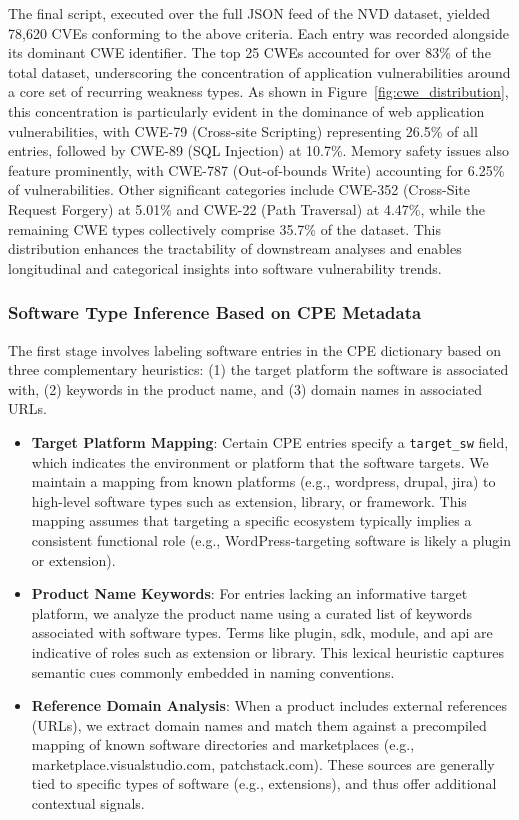 The final script, executed over the full JSON feed of the NVD dataset, yielded 78,620 CVEs conforming to the above criteria. Each entry was recorded alongside its dominant CWE identifier. The top 25 CWEs accounted for over 83\% of the total dataset, underscoring the concentration of application vulnerabilities around a core set of recurring weakness types. As shown in Figure~\ref{fig:cwe_distribution}, this concentration is particularly evident in the dominance of web application vulnerabilities, with CWE-79 (Cross-site Scripting) representing 26.5\% of all entries, followed by CWE-89 (SQL Injection) at 10.7\%. Memory safety issues also feature prominently, with CWE-787 (Out-of-bounds Write) accounting for 6.25\% of vulnerabilities. Other significant categories include CWE-352 (Cross-Site Request Forgery) at 5.01\% and CWE-22 (Path Traversal) at 4.47\%, while the remaining CWE types collectively comprise 35.7\% of the dataset. This distribution enhances the tractability of downstream analyses and enables longitudinal and categorical insights into software vulnerability trends.

\subsubsection{Software Type Inference Based on CPE Metadata}
The first stage involves labeling software entries in the CPE dictionary based on three complementary heuristics: (1) the target platform the software is associated with, (2) keywords in the product name, and (3) domain names in associated URLs.

\begin{itemize}
    \item \textbf{Target Platform Mapping}: Certain CPE entries specify a \texttt{target\_sw} field, which indicates the environment or platform that the software targets. We maintain a mapping from known platforms (e.g., wordpress, drupal, jira) to high-level software types such as extension, library, or framework. This mapping assumes that targeting a specific ecosystem typically implies a consistent functional role (e.g., WordPress-targeting software is likely a plugin or extension).
    \item \textbf{Product Name Keywords}: For entries lacking an informative target platform, we analyze the product name using a curated list of keywords associated with software types. Terms like plugin, sdk, module, and api are indicative of roles such as extension or library. This lexical heuristic captures semantic cues commonly embedded in naming conventions.
    \item \textbf{Reference Domain Analysis}: When a product includes external references (URLs), we extract domain names and match them against a precompiled mapping of known software directories and marketplaces (e.g., marketplace.visualstudio.com, patchstack.com). These sources are generally tied to specific types of software (e.g., extensions), and thus offer additional contextual signals.
\end{itemize}

